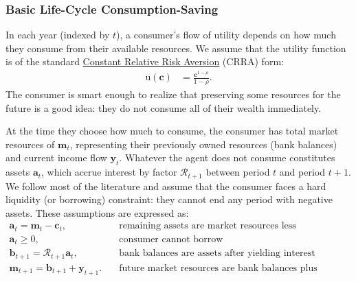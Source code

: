 \documentclass[12pt,letterpaper, fleqn]{article}
\newcommand{\CRRA}{\rho}
\newcommand{\uFunc}{\mathrm{u}}
\newcommand{\cLvl}{\mathbf{c}}
\newcommand{\mLvl}{\mathbf{m}}
\newcommand{\yLvl}{\mathbf{y}}
\newcommand{\aLvl}{\mathbf{a}}
\newcommand{\Rport}{\mathcal{R}}
\newcommand{\bLvl}{\mathbf{b}}
\begin{document}
\subsubsection{Basic Life-Cycle Consumption-Saving}\label{basic-cs}

In each year (indexed by $t$), a consumer's flow of utility depends on how much they consume from their available resources.
We assume that the utility function is of the standard \href{https://en.wikipedia.org/wiki/Isoelastic\_utility}{Constant Relative Risk Aversion} (CRRA) form:
\begin{align}
    \uFunc(\cLvl) & = \frac{\cLvl^{1-\CRRA}}{1-\CRRA}.
\end{align}
The consumer is smart enough to realize that preserving some resources for the future is a good idea: they do not consume all of their wealth immediately.

At the time they choose how much to consume, the consumer has total market resources of $\mLvl_t$, representing their previously owned resources (bank balances) and current income flow $\yLvl_t$.
Whatever the agent does not consume constitutes assets $\aLvl_t$, which accrue interest by factor $\Rport_{t+1}$ between period $t$ and period $t+1$.
We follow most of the literature and assume that the consumer faces a hard liquidity (or borrowing) constraint: they cannot end any period with negative assets.
These assumptions are expressed as:
\begin{align}
    \aLvl_t = \mLvl_t - \cLvl_t, & \text{~~~remaining assets are market resources less consumption} \\
    \aLvl_t \geq 0, & \text{~~~consumer cannot borrow} \\
    \bLvl_{t+1} = \Rport_{t+1} \aLvl_t, & \text{~~~bank balances are assets after yielding interest} \\
    \mLvl_{t+1} = \bLvl_{t+1} + \yLvl_{t+1}. & \text{~~~future market resources are bank balances plus income}
\end{align}
\end{document}
